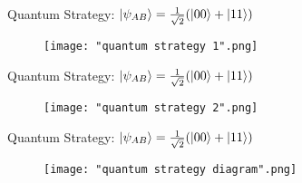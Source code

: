 \documentclass[handout, 10 pt]{beamer}
\begin{document}

\begin{comment}
this can be {\emph{improved}} by making use of quantum mechanics!  The idea is that Alice and Bob can make use of a strategy where even though neither sees which question the other is asked, their answers are {\emph{correlated}}.
\begin{equation*}
    \ket{\psi_{AB}}=\frac{1}{\sqrt{2}}(\ket{00}+\ket{11})
\end{equation*}
$$0.75<0.85$$
It's s simplified version of "CHSH experiment".
\end{comment}
\begin{frame}{Quantum Strategy:     $\ket{\psi_{AB}}=\frac{1}{\sqrt{2}}(\ket{00}+\ket{11})$}
    \begin{figure}[h]
    \centering
    \texttt{[image: "quantum strategy 1".png]}
    \end{figure}
\end{frame}

\begin{frame}{Quantum Strategy:     $\ket{\psi_{AB}}=\frac{1}{\sqrt{2}}(\ket{00}+\ket{11})$}
    \begin{figure}[h]
    \centering
    \texttt{[image: "quantum strategy 2".png]}
    \end{figure}
\end{frame}

\begin{frame}{Quantum Strategy:     $\ket{\psi_{AB}}=\frac{1}{\sqrt{2}}(\ket{00}+\ket{11})$}
    \begin{figure}[h]
    \centering
    \texttt{[image: "quantum strategy diagram".png]}
    \label{fig: quantum strategy diagram}
    \end{figure}
\end{frame}

\end{document}
